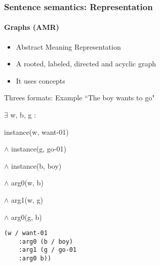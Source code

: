 \documentclass[xcolor=table]{beamer}
\begin{document}
\begin{frame}[fragile]
	\frametitle{Sentence semantics: Representation}
	\framesubtitle{Graphs (AMR)}
	
	\begin{itemize}
		\item Abstract Meaning Representation \cite{2013-banarescu-al}
		\item A rooted, labeled, directed and acyclic graph
		\item It uses  concepts
	\end{itemize}

	\begin{exampleblock}{Threes formats: Example ``The boy wants to go"}
		\begin{minipage}{.3\textwidth}
			
			\footnotesize
			$ \exists $ w, b, g : 
			
			instance(w, want-01) 
			
			$ \wedge $ instance(g, go-01) 
			
			$ \wedge $ instance(b, boy) 
			
			$ \wedge $ arg0(w, b) 
			
			$ \wedge $ arg1(w, g) 
			
			$ \wedge $ arg0(g, b)
		\end{minipage}
		\begin{minipage}{.35\textwidth}
			
			\begin{verbatim}
(w / want-01
    :arg0 (b / boy)
    :arg1 (g / go-01
    :arg0 b))
			\end{verbatim}
			
		\end{minipage}
		\begin{minipage}{.3\textwidth}
			
		\end{minipage}
	\end{exampleblock}
	
\end{frame}
\end{document}
